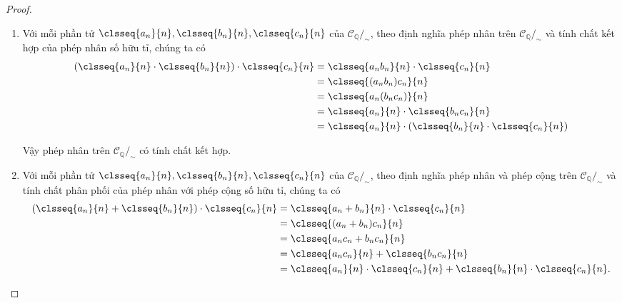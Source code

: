 \begin{proof}
    \begin{enumerate}[label={(\roman*)}]
        \item Với mỗi phần tử $\clsseq{a_{n}}{n}, \clsseq{b_{n}}{n}, \clsseq{c_{n}}{n}$ của $\mathscr{C}_{\mathbb{Q}}/_{\sim}$, theo định nghĩa phép nhân trên $\mathscr{C}_{\mathbb{Q}}/_{\sim}$ và tính chất kết hợp của phép nhân số hữu tỉ, chúng ta có
              \begin{align*}
                  \left(\clsseq{a_{n}}{n} \cdot \clsseq{b_{n}}{n}\right) \cdot \clsseq{c_{n}}{n} & = \clsseq{a_{n}b_{n}}{n} \cdot \clsseq{c_{n}}{n}                                 \\
                                                                                                 & = \clsseq{(a_{n}b_{n})c_{n}}{n}                                                  \\
                                                                                                 & = \clsseq{a_{n}(b_{n}c_{n})}{n}                                                  \\
                                                                                                 & = \clsseq{a_{n}}{n} \cdot \clsseq{b_{n}c_{n}}{n}                                 \\
                                                                                                 & = \clsseq{a_{n}}{n} \cdot \left(\clsseq{b_{n}}{n} \cdot \clsseq{c_{n}}{n}\right)
              \end{align*}

              Vậy phép nhân trên $\mathscr{C}_{\mathbb{Q}}/_{\sim}$ có tính chất kết hợp.
        \item Với mỗi phần tử $\clsseq{a_{n}}{n}, \clsseq{b_{n}}{n}, \clsseq{c_{n}}{n}$ của $\mathscr{C}_{\mathbb{Q}}/_{\sim}$, theo định nghĩa phép nhân và phép cộng trên $\mathscr{C}_{\mathbb{Q}}/_{\sim}$ và tính chất phân phối của phép nhân với phép cộng số hữu tỉ, chúng ta có
              \begin{align*}
                  \left(\clsseq{a_{n}}{n} + \clsseq{b_{n}}{n}\right) \cdot \clsseq{c_{n}}{n} & = \clsseq{a_{n} + b_{n}}{n} \cdot \clsseq{c_{n}}{n}                                      \\
                                                                                             & = \clsseq{(a_{n}+ b_{n})c_{n}}{n}                                                        \\
                                                                                             & = \clsseq{a_{n}c_{n} + b_{n}c_{n}}{n}                                                    \\
                                                                                             & = \clsseq{a_{n}c_{n}}{n} + \clsseq{b_{n}c_{n}}{n}                                        \\
                                                                                             & = \clsseq{a_{n}}{n} \cdot \clsseq{c_{n}}{n} + \clsseq{b_{n}}{n} \cdot \clsseq{c_{n}}{n}.
              \end{align*}


\end{enumerate}
\end{proof}
